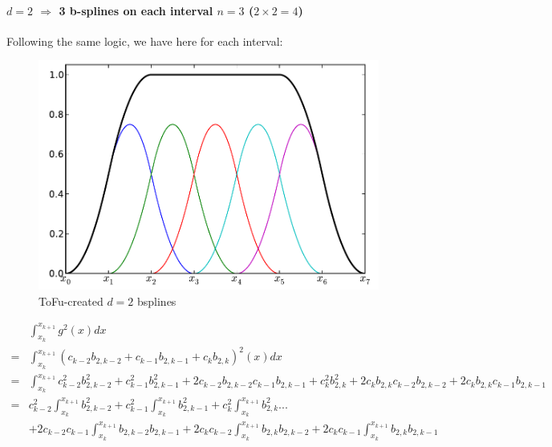 \documentclass[paper=a4, fontsize=11pt]{scrartcl}
\numberwithin{equation}{section}		%
\numberwithin{figure}{section}			%
\numberwithin{table}{section}				%
\begin{document}
\begin{landscape}
\newpage
\paragraph{\textbf{$d=2$ $\Rightarrow$ 3 b-splines on each interval $n=3$ ($2\times2=4$)}}

Following the same logic, we have here for each interval:

\begin{figure}
  \vspace{-20pt}
  \begin{center}
    \includegraphics[scale=0.4]{Fig01_BSplines_Int_D2.pdf}
  \end{center}
  \vspace{-20pt}
  \caption{\footnotesize ToFu-created $d=2$ bsplines}
  \vspace{-10pt}
\end{figure}

$$
\begin{array}{lll}
& \int_{x_k}^{x_{k+1}} g^2(x)dx\\
= & \int_{x_k}^{x_{k+1}} \left( c_{k-2}b_{2,k-2} + c_{k-1}b_{2,k-1} + c_{k}b_{2,k} \right)^2(x)dx \\
= & \int_{x_k}^{x_{k+1}} c_{k-2}^2b_{2,k-2}^2 + c_{k-1}^2b_{2,k-1}^2 + 2c_{k-2}b_{2,k-2}c_{k-1}b_{2,k-1} + c_{k}^2b_{2,k}^2 + 2c_{k}b_{2,k}c_{k-2}b_{2,k-2} + 2c_{k}b_{2,k}c_{k-1}b_{2,k-1} \\
= & c_{k-2}^2\int_{x_k}^{x_{k+1}}b_{2,k-2}^2 + c_{k-1}^2\int_{x_k}^{x_{k+1}}b_{2,k-1}^2 + c_{k}^2\int_{x_k}^{x_{k+1}}b_{2,k}^2 ...\\
  &  + 2c_{k-2}c_{k-1}\int_{x_k}^{x_{k+1}}b_{2,k-2}b_{2,k-1} + 2c_{k}c_{k-2}\int_{x_k}^{x_{k+1}}b_{2,k}b_{2,k-2} + 2c_{k}c_{k-1}\int_{x_k}^{x_{k+1}}b_{2,k}b_{2,k-1}
\end{array}
$$


\end{landscape}
\end{document}
